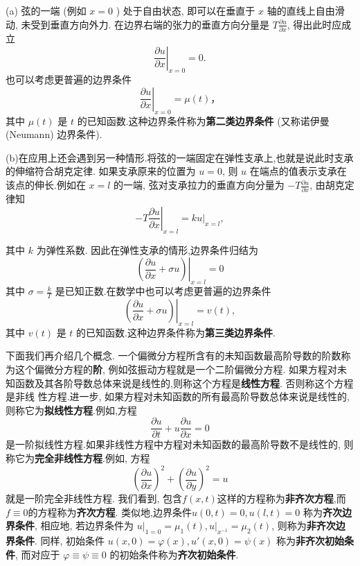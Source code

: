 (a) 弦的一端 (例如 $x=0$ ) 处于自由状态, 即可以在垂直于 $x$ 轴的直线上自由滑动, 未受到垂直方向外力.
在边界右端的张力的垂直方向分量是 $T \frac{\partial u}{\partial x}$, 得出此时应成立
$$
\left.\frac{\partial u}{\partial x}\right|_{x=0}=0 .
$$
也可以考虑更普遍的边界条件
$$
\left.\frac{\partial u}{\partial x}\right|_{x=0}=\mu(t) ，
$$
其中 $\mu(t)$ 是 $t$ 的已知函数.这种边界条件称为\textbf{第二类边界条件} (又称诺伊曼 (Neumann) 边界条件).

(b)在应用上还会遇到另一种情形.将弦的一端固定在弹性支承上,也就是说此时支承的伸缩符合胡克定律. 
如果支承原来的位置为 $u=0$, 则 $u$ 在端点的值表示支承在该点的伸长.例如在 $x=l$ 的一端, 
弦对支承拉力的垂直方向分量为 $-T \frac{\partial u}{\partial x}$, 由胡克定律知
$$
-\left.T \frac{\partial u}{\partial x}\right|_{x=l}=\left.k u\right|_{x=l},
$$

其中 $k$ 为弹性系数. 因此在弹性支承的情形,边界条件归结为
$$
\left.\left(\frac{\partial u}{\partial x}+\sigma u\right)\right|_{x=l}=0
$$
其中 $\sigma=\frac{k}{T}$ 是已知正数.在数学中也可以考虑更普遍的边界条件
$$
\left.\left(\frac{\partial u}{\partial x}+\sigma u\right)\right|_{x=l}=v(t),
$$
其中 $v(t)$ 是 $t$ 的已知函数.这种边界条件称为\textbf{第三类边界条件}.

下面我们再介绍几个概念. 一个偏微分方程所含有的未知函数最高阶导数的阶数称为这个偏微分方程的\textbf{阶}, 例如弦振动方程就是一个二阶偏微分方程.
如果方程对未知函数及其各阶导数总体来说是线性的,则称这个方程是\textbf{线性方程}. 否则称这个方程是非线
性方程.进一步, 如果方程对未知函数的所有最高阶导数总体来说是线性的, 则称它为\textbf{拟线性方程}.例如,方程
$$
\frac{\partial u}{\partial t}+u \frac{\partial u}{\partial x}=0
$$
是一阶拟线性方程.如果非线性方程中方程对未知函数的最高阶导数不是线性的, 则称它为\textbf{完全非线性方程}.例如, 方程
$$
\left(\frac{\partial u}{\partial x}\right)^2+\left(\frac{\partial u}{\partial y}\right)^2=u
$$
就是一阶完全非线性方程.
我们看到, 包含$f(x, t)$这样的方程称为\textbf{非齐次方程},而 $f\equiv 0$的方程称为\textbf{齐次方程}.
类似地,边界条件$u(0,t) = 0, u(l, t) = 0$ 称为\textbf{齐次边界条件},
相应地, 若边界条件为 $\left.u\right|_{1=0}=\mu_1(t),\left.u\right|_{x^{-1}}=\mu_2(t)$, 则称为\textbf{非齐次边界条件}.
同样, 初始条件 $u(x, 0) = \varphi(x), u'(x, 0) = \psi(x)$ 称为\textbf{非齐次初始条件}, 
而对应于 $\varphi \equiv \psi \equiv 0$ 的初始条件称为\textbf{齐次初始条件}.

